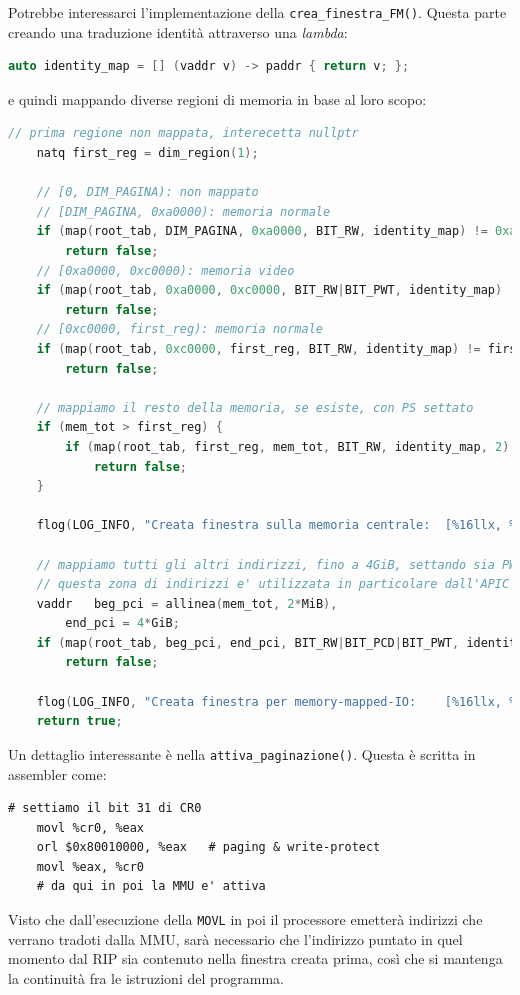 \documentclass[a4paper,11pt]{article}
\begin{document}
Potrebbe interessarci l'implementazione della \lstinline|crea_finestra_FM()|.
Questa parte creando una traduzione identità attraverso una \textit{lambda}:
\begin{lstlisting}[language=C++, style=codestyle]	
auto identity_map = [] (vaddr v) -> paddr { return v; };
\end{lstlisting}
e quindi mappando diverse regioni di memoria in base al loro scopo:
\begin{lstlisting}[language=C++, style=codestyle]	
	// prima regione non mappata, interecetta nullptr
	natq first_reg = dim_region(1);

	// [0, DIM_PAGINA): non mappato
	// [DIM_PAGINA, 0xa0000): memoria normale
	if (map(root_tab, DIM_PAGINA, 0xa0000, BIT_RW, identity_map) != 0xa0000)
		return false;
	// [0xa0000, 0xc0000): memoria video
	if (map(root_tab, 0xa0000, 0xc0000, BIT_RW|BIT_PWT, identity_map) != 0xc0000)
		return false;
	// [0xc0000, first_reg): memoria normale
	if (map(root_tab, 0xc0000, first_reg, BIT_RW, identity_map) != first_reg)
		return false;

	// mappiamo il resto della memoria, se esiste, con PS settato
	if (mem_tot > first_reg) {
		if (map(root_tab, first_reg, mem_tot, BIT_RW, identity_map, 2) != mem_tot)
			return false;
	}

	flog(LOG_INFO, "Creata finestra sulla memoria centrale:  [%16llx, %16llx)", DIM_PAGINA, mem_tot);

	// mappiamo tutti gli altri indirizzi, fino a 4GiB, settando sia PWT che PCD.
	// questa zona di indirizzi e' utilizzata in particolare dall'APIC per mappare i propri registri.
	vaddr	beg_pci = allinea(mem_tot, 2*MiB),
		end_pci = 4*GiB;
	if (map(root_tab, beg_pci, end_pci, BIT_RW|BIT_PCD|BIT_PWT, identity_map, 2) != end_pci)
		return false;

	flog(LOG_INFO, "Creata finestra per memory-mapped-IO:    [%16llx, %16llx)", beg_pci, end_pci);
	return true;
\end{lstlisting}

Un dettaglio interessante è nella \lstinline|attiva_paginazione()|.
Questa è scritta in assembler come:
\begin{lstlisting}[language=aSSembler, style=codestyle]	
# settiamo il bit 31 di CR0
	movl %cr0, %eax
	orl $0x80010000, %eax	# paging & write-protect
	movl %eax, %cr0
	# da qui in poi la MMU e' attiva
\end{lstlisting}
Visto che dall'esecuzione della \lstinline|MOVL| in poi il processore emetterà indirizzi che verrano tradoti dalla MMU, sarà necessario che l'indirizzo puntato in quel momento dal RIP sia contenuto nella finestra creata prima, così che si mantenga la continuità fra le istruzioni del programma.
\end{document}
